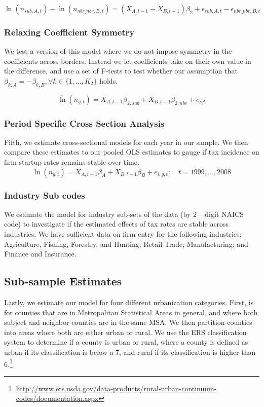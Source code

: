 \documentclass[12pt,a4paper]{article}
\begin{document}
\begin{equation}
\ln(n_{sub,A,t})-\ln(n_{nbr\_nbr,B,t}) = (X_{A,t-1}-X_{B,t-1})\beta_{2} + \epsilon_{sub,A,t}-\epsilon_{nbr\_nbr,B,t}
\end{equation}

\subsubsection{Relaxing Coefficient Symmetry}
We test a version of this model where we do not impose symmetry in the coefficients across borders. Instead we let coefficients take on their own value in the difference, and use a set of F-tests to test whether our assumption that $\beta_{k,A} = - \beta_{k,B}, \forall k \in \{1,...,K_{2}\}$ holds. 

\begin{equation}\label{sense1}
\ddot \ln(n_{g,t}) = X_{A,t-1}\beta_{2,sub}+X_{B,t-1}\beta_{2,nbr}+ \ddot e_{igt} 
\end{equation}

\subsubsection{Period Specific Cross Section Analysis}
Fifth, we estimate cross-sectional models for each year in our sample. We then compare these estimates to our pooled OLS estimates to gauge if tax incidence on firm startup rates remains stable over time.
\begin{equation}\label{sense2}
\ddot \ln(n_{g,t})  = X_{A,t-1}\beta_{A}+X_{B,t-1}\beta_{B}+ e_{i,g,t}: \quad t = 1999,...,2008
\end{equation}


\subsubsection{Industry Sub codes}

We estimate the model for industry sub-sets of the data (by 2 – digit NAICS code) to investigate if the estimated effects of tax rates are stable across industries.  We have sufficient data on firm entry for the following industries: Agriculture, Fishing, Forestry, and Hunting; Retail Trade; Manufacturing; and Finance and Insurance.

\subsection{Sub-sample Estimates}

Lastly, we estimate our model for four different urbanization categories. First, is for counties that are in Metropolitan Statistical Areas in general, and where both subject and neighbor counties are in the same MSA. We then partition counties into areas where both are  either urban or rural. We use the ERS classification system to determine if a county is urban or rural, where a county is defined as urban if its classification is below a 7, and rural if its classification is higher than 6.\footnote{\url{http://www.ers.usda.gov/data-products/rural-urban-continuum-codes/documentation.aspx}}
\end{document}

